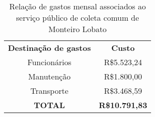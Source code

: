 \begin{table}[htbp]
  \centering
  \caption{Relação de gastos mensal associados ao serviço público de coleta comum de Monteiro Lobato}
    \begin{tabular}{c|c}
    \rowcolor[rgb]{ .969,  .588,  .275} \textcolor[rgb]{ 1,  1,  1}{\textbf{Destinação de gastos}} & \textcolor[rgb]{ 1,  1,  1}{\textbf{Custo}} \\
    \rowcolor[rgb]{ .992,  .914,  .851} Funcionários & R\$5.523,24 \\
    \rowcolor[rgb]{ .984,  .831,  .706} Manutenção & R\$1.800,00 \\
    \rowcolor[rgb]{ .992,  .914,  .851} Transporte & R\$3.468,59 \\
    \rowcolor[rgb]{ .984,  .831,  .706} \textbf{TOTAL} & \textbf{R\$10.791,83} \\
    \end{tabular}%
  \label{tab:destinacao_gasto}%
\end{table}%

